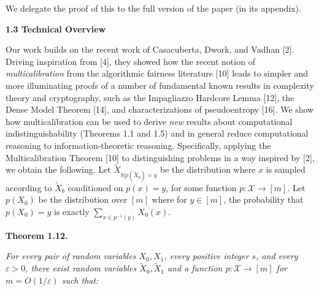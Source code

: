 \documentclass[10pt,a4paper]{article}
\begin{document}



We delegate the proof of this to the full version of the paper (in its appendix).\par





\par\medskip\noindent\textbf{
1.3 Technical Overview}\par




Our work builds on the recent work of Casacuberta, Dwork, and Vadhan [2]. Driving inspiration from [4], they showed how the recent notion of \emph{multicalibration} from the algorithmic fairness literature [10] leads to simpler and more illuminating proofs of a number of fundamental known results in complexity theory and cryptography, such as the Impagliazzo Hardcore Lemma [12], the Dense Model Theorem [14], and characterizations of pseudoentropy [16]. We show how multicalibration can be used to derive \emph{new} results about computational indistinguishability (Theorems 1.1 and 1.5) and in general reduce computational reasoning to information-theoretic reasoning. Specifically, applying the Multicalibration Theorem [10] to distinguishing problems in a way inspired by [2], we obtain the following. Let $\widetilde{X}_{b|p(\widetilde{X}_{b})=y}$ be the distribution where $x$ is sampled according to $\widetilde{X}_{b}$ conditioned on $p(x)=y$, for some function $p:\mathcal{X}\to[m]$. Let $p(X_{0})$ be the distribution over $[m]$ where for $y\in[m]$, the probability that $p(X_{0})=y$ is exactly $\sum_{x\in p^{-1}(y)}X_{0}(x)$.\par





\par\medskip\noindent\textbf{
\textbf{Theorem 1.12}\textbf{.}
}\par



\emph{For every pair of random variables $X_{0},X_{1}$, every positive integer $s$, and every $\varepsilon>0$, there exist random variables $\widetilde{X}_{0},\widetilde{X}_{1}$ and a function $p:\mathcal{X}\to[m]$ for $m=O(1/\varepsilon)$ such that:}\par
\end{document}
